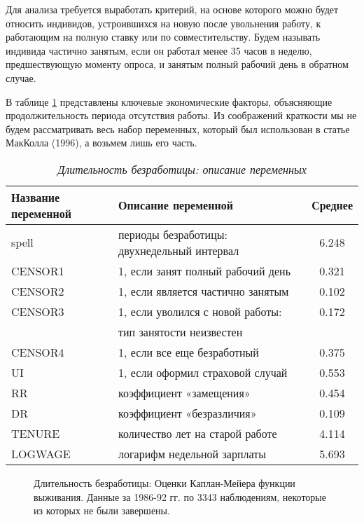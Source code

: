 Для анализа требуется выработать критерий, на основе которого можно будет относить индивидов, устроившихся на новую после увольнения работу, к работающим на полную ставку или по совместительству. Будем называть индивида частично занятым, если он работал менее 35 часов в неделю, предшествующую моменту опроса, и занятым полный рабочий день в обратном случае.

В таблице \ref{tab:17.6} представлены ключевые экономические факторы, объясняющие продолжительность периода отсутствия работы. Из соображений краткости мы не будем рассматривать весь набор переменных, который был использован в статье МакКолла (1996), а возьмем лишь его часть.
    \begin{table}[!htbp]\caption{\textit{Длительность безработицы: описание переменных}}\label{tab:17.6}
    \begin{center}
\begin{tabular}{llc}
\hline \hline
\textbf{Название переменной}&\textbf{Описание переменной}           &\textbf{Среднее}\\
\hline
spell       &периоды безработицы: двухнедельный интервал            &6.248\\
CENSOR1     &1, если занят полный рабочий день                      &0.321\\
CENSOR2     &1, если является частично занятым                      &0.102\\
CENSOR3     &1, если уволился с новой работы:                       &0.172\\
            &тип занятости неизвестен                               &\\
CENSOR4     &1, если все еще безработный                            &0.375\\
UI          &1, если оформил страховой случай                       &0.553\\
RR          &коэффициент «замещения»                                &0.454\\
DR          &коэффициент «безразличия»                              &0.109\\
TENURE      &количество лет на старой работе                        &4.114\\
LOGWAGE     &логарифм недельной зарплаты                            &5.693\\
\hline \hline
\end{tabular}
    \end{center}
    \end{table}

\begin{figure}[ht!]\caption{Длительность безработицы: Оценки Каплан-Мейера функции выживания. Данные за 1986-92 гг. по 3343 наблюдениям, некоторые из которых не были завершены.}\label{fig:17.3}
\centering
\end{figure}

